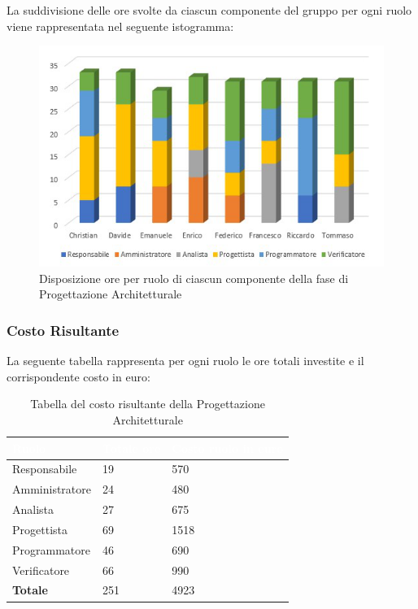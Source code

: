 La suddivisione delle ore svolte da ciascun componente del gruppo per ogni ruolo viene rappresentata nel seguente istogramma:
\begin{figure}[h!]
	\centering
	\includegraphics[scale=3]{Sezioni/Istogrammi/IstogrammaProgettArchitetturale.png}
	\caption{Disposizione ore per ruolo di ciascun componente della fase di Progettazione Architetturale}
\end{figure}

\clearpage

\subsubsection{Costo Risultante}
La seguente tabella rappresenta per ogni ruolo le ore totali investite e il corrispondente costo in euro:
{
\renewcommand{\arraystretch}{2}
\begin{longtable}{ C{3cm} C{2cm} C{4cm}}
\caption{Tabella del costo risultante della Progettazione Architetturale}\\

\textcolor{white}{\textbf{Ruolo}} & 
\textcolor{white}{\textbf{Totale ore}} & 
\textcolor{white}{\textbf{Costo ruolo in euro}}\\	
\endhead
        
Responsabile    &  19 &  570 \\
Amministratore  &  24 &  480 \\
Analista        &  27 &  675 \\
Progettista     &  69 & 1518 \\
Programmatore   &  46 &  690 \\
Verificatore    &  66 &  990 \\
\textbf{Totale} & 251 & 4923 \\	
        	
\end{longtable}
}

